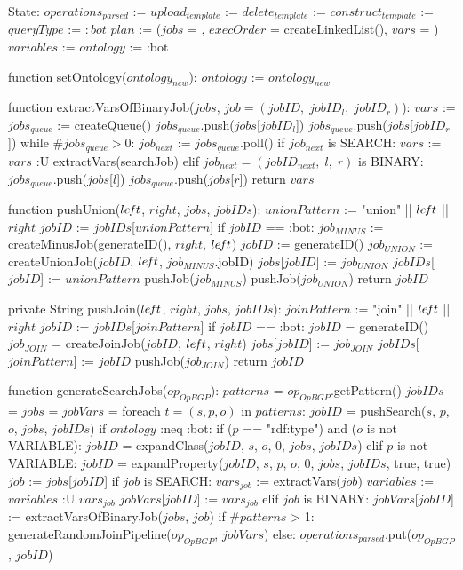 State:
    $operations_{parsed}$ := {}
    $upload_{template}$ := {}
    $delete_{template}$ := {}
    $construct_{template}$ := {}
    $queryType$ := $:bot$
    $plan$ := ($jobs$ = {}, $execOrder$ = createLinkedList(), $vars$ = {})
    $variables$ := {}
    $ontology$ := :bot

function setOntology($ontology_{new}$):
    $ontology$ := $ontology_{new}$

function extractVarsOfBinaryJob($jobs$, $job = (jobID, \; jobID_l, \; jobID_r)$): 
    $vars$ := {}
    $jobs_{queue}$ := createQueue()
    $jobs_{queue}$.push($jobs$[$jobID_l$])
    $jobs_{queue}$.push($jobs$[$jobID_r$])
    while $\#jobs_{queue} > 0$: 
        $job_{next}$ := $jobs_{queue}$.poll()
        if $job_{next}$ is SEARCH:
            $vars$ := $vars$ :U extractVars(searchJob)
        elif $job_{next} = (jobID_{next}, \; l, \; r)$ is BINARY:
            $jobs_{queue}$.push($jobs$[$l$])
            $jobs_{queue}$.push($jobs$[$r$])
    return $vars$

function pushUnion($le\textrm{\emph{f}}t$, $right$, $jobs$, $jobIDs$): 
    $unionPattern$ := "union" || $le\textrm{\emph{f}}t$ || $right$
    $jobID$ := $jobIDs$[$unionPattern$]
    if $jobID$ == :bot: 
        $job_{MINUS}$ := createMinusJob(generateID(), $right$, $le\textrm{\emph{f}}t$)
        $jobID$ := generateID()
        $job_{UNION}$ := createUnionJob($jobID$, $le\textrm{\emph{f}}t$, $job_{MINUS}$.jobID)
        $jobs$[$jobID$] := $job_{UNION}$
        $jobIDs$[$jobID$] := $unionPattern$
        pushJob($job_{MINUS}$)
        pushJob($job_{UNION}$)
    return $jobID$

private String pushJoin($le\textrm{\emph{f}}t$, $right$, $jobs$, $jobIDs$):
    $joinPattern$ := "join" || $le\textrm{\emph{f}}t$ || $right$
    $jobID$ := $jobIDs$[$joinPattern$]
    if $jobID$ == :bot:
        $jobID$ = generateID()
        $job_{JOIN}$ = createJoinJob($jobID$, $le\textrm{\emph{f}}t$, $right$)
        $jobs$[$jobID$] := $job_{JOIN}$
        $jobIDs$[$joinPattern$] := $jobID$
        pushJob($job_{JOIN}$)
    return $jobID$

function generateSearchJobs($op_{OpBGP}$):
    $patterns$ = $op_{OpBGP}$.getPattern()
    $jobIDs$ = {}
    $jobs$ = {}
    $jobVars$ = {}
    foreach $t = (s, p, o)$ in $patterns$:
        $jobID$ = pushSearch($s$, $p$, $o$, $jobs$, $jobIDs$)
        if $ontology$ :neq :bot:
            if ($p$ == "rdf:type") and ($o$ is not VARIABLE):
                $jobID$ = expandClass($jobID$, $s$, $o$, 0, $jobs$, $jobIDs$)
            elif $p$ is not VARIABLE:
                $jobID$ = expandProperty($jobID$, $s$, $p$, $o$, 0, $jobs$, $jobIDs$, true, true)
        $job$ := $jobs$[$jobID$]
        if $job$ is SEARCH:
            $vars_{job}$ := extractVars($job$)
            $variables$ := $variables$ :U $vars_{job}$
            $jobVars$[$jobID$] := $vars_{job}$
        elif $job$ is BINARY:
            $jobVars$[$jobID$] := extractVarsOfBinaryJob($jobs$, $job$)
    if $\#patterns$ > 1:
        generateRandomJoinPipeline($op_{OpBGP}$, $jobVars$)
    else:
        $operations_{parsed}$.put($op_{OpBGP}$, $jobID$)

